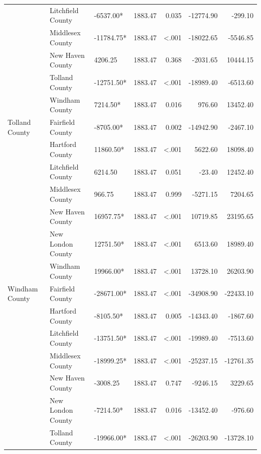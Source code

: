 \documentclass[12pt]{article}
\begin{document}
\begin{table}[htbp]
{\begin{tabular}{lllrrrr}
    & Litchfield County & -6537.00* & 1883.47 & 0.035 & -12774.90 & -299.10 \\
    & Middlesex County & -11784.75* & 1883.47 & <.001 & -18022.65 & -5546.85 \\
    & New Haven County & 4206.25 & 1883.47 & 0.368 & -2031.65 & 10444.15 \\
    & Tolland County & -12751.50* & 1883.47 & <.001 & -18989.40 & -6513.60 \\
    & Windham County & 7214.50* & 1883.47 & 0.016 & 976.60 & 13452.40 \\
    \midrule
    Tolland County & Fairfield County & -8705.00* & 1883.47 & 0.002 & -14942.90 & -2467.10 \\
    & Hartford County & 11860.50* & 1883.47 & <.001 & 5622.60 & 18098.40 \\
    & Litchfield County & 6214.50 & 1883.47 & 0.051 & -23.40 & 12452.40 \\
    & Middlesex County & 966.75 & 1883.47 & 0.999 & -5271.15 & 7204.65 \\
    & New Haven County & 16957.75* & 1883.47 & <.001 & 10719.85 & 23195.65 \\
    & New London County & 12751.50* & 1883.47 & <.001 & 6513.60 & 18989.40 \\
    & Windham County & 19966.00* & 1883.47 & <.001 & 13728.10 & 26203.90 \\
    \midrule
    Windham County & Fairfield County & -28671.00* & 1883.47 & <.001 & -34908.90 & -22433.10 \\
    & Hartford County & -8105.50* & 1883.47 & 0.005 & -14343.40 & -1867.60 \\
    & Litchfield County & -13751.50* & 1883.47 & <.001 & -19989.40 & -7513.60 \\
    & Middlesex County & -18999.25* & 1883.47 & <.001 & -25237.15 & -12761.35 \\
    & New Haven County & -3008.25 & 1883.47 & 0.747 & -9246.15 & 3229.65 \\
    & New London County & -7214.50* & 1883.47 & 0.016 & -13452.40 & -976.60 \\
    & Tolland County & -19966.00* & 1883.47 & <.001 & -26203.90 & -13728.10 \\
    \bottomrule
  \end{tabular}%
  }
\end{table}
    
\end{document}
